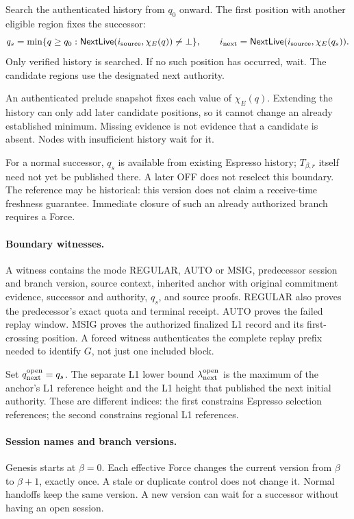 \documentclass[11pt,a4paper]{article}
\newcommand{\tagg}[1]{\ensuremath{\mathsf{#1}}}
\begin{document}
Search the authenticated history from $q_0$ onward. The first position
with another eligible region fixes the successor:
\[
 q_s=\min\{q\ge q_0:\tagg{NextLive}(i_{\rm source},\chi_E(q))\ne\bot\},
 \qquad i_{\rm next}=\tagg{NextLive}(i_{\rm source},\chi_E(q_s)).
\]
Only verified history is searched. If no such position has occurred,
wait. The candidate regions use the designated next authority.

An authenticated prelude snapshot fixes each value of $\chi_E(q)$.
Extending the history can only add later candidate positions, so it
cannot change an already established minimum. Missing evidence is not
evidence that a candidate is absent. Nodes with insufficient history
wait for it.

For a normal successor, $q_s$ is available from existing Espresso
history; $T_{\beta,r}$ itself need not yet be published there. A later OFF does
not reselect this boundary. The reference may be historical: this
version does not claim a receive-time freshness guarantee. Immediate
closure of such an already authorized branch requires a Force.

\paragraph{Boundary witnesses.}
A witness contains the mode REGULAR, AUTO or MSIG, predecessor session
and branch version, source context, inherited anchor with original commitment evidence,
successor and authority, $q_s$, and source proofs. REGULAR also proves
the predecessor's exact quota and terminal receipt. AUTO proves the
failed replay window. MSIG proves the authorized finalized L1 record
and its first-crossing position. A forced witness authenticates the
complete replay prefix needed to identify $G$, not just one included
block.

Set $q^{\rm open}_{\rm next}=q_s$. The separate L1 lower bound
$\lambda^{\rm open}_{\rm next}$ is the maximum of the anchor's L1
reference height and the L1 height that published the next initial
authority. These are different indices: the first constrains Espresso
selection references; the second constrains regional L1 references.

\paragraph{Session names and branch versions.}
Genesis starts at $\beta=0$. Each effective Force changes the current
version from $\beta$ to $\beta+1$, exactly once. A stale or duplicate
control does not change it. Normal handoffs keep the same version.
A new version can wait for a successor without having an open session.
\end{document}
